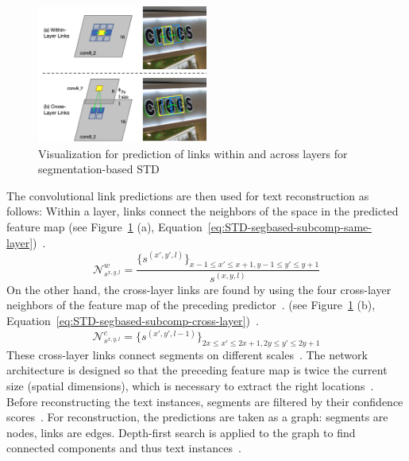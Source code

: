 \begin{figure}[ht]
    \centering
    \includegraphics[width=0.5\textwidth]{img/STD-seg-based-links-Shi-Detecting-2017.png}
    \caption[Link prediction for segmentation-based STD]{%
        Visualization for prediction of links within and across layers for segmentation-based
        STD~\citep{shi_detecting_2017}\label{fig:STD-segbased-component-links}
    }
\end{figure}
The convolutional link predictions are then used for text reconstruction as follows:
Within a layer, links connect the neighbors of the space in the predicted feature map
(see Figure~\ref{fig:STD-segbased-component-links} (a),
Equation~\ref{eq:STD-segbased-subcomp-same-layer})~\citep{shi_detecting_2017}.
\begin{equation}\label{eq:STD-segbased-subcomp-same-layer}
    \mathcal{N}_{s^{x,y,l}}^w =
        \frac{{\{s^{(x',y',l)}\}}_{x-1\leq x'\leq x+1,y-1\leq y'\leq y+1}}{s^{(x,y,l)}}
\end{equation}
On the other hand, the cross-layer links are found by using the four cross-layer neighbors of the
feature map of the preceding predictor~\citep{shi_detecting_2017}.
(see Figure~\ref{fig:STD-segbased-component-links} (b),
Equation~\ref{eq:STD-segbased-subcomp-cross-layer})~\citep{shi_detecting_2017}.
\begin{equation}\label{eq:STD-segbased-subcomp-cross-layer}
    \mathcal{N}_{s^{x,y,l}}^c = {\{s^{(x',y',l-1)}\}}_{2x\leq x'\leq 2x+1,2y\leq y'\leq 2y+1}
\end{equation}
These cross-layer links connect segments on different scales~\citep{shi_detecting_2017}.
The network architecture is designed so that the preceding feature map is twice the current size
(spatial dimensions), which is necessary to extract the right
locations~\citep{shi_detecting_2017}.
Before reconstructing the text instances, segments are filtered by their confidence
scores~\citep{shi_detecting_2017}.
For reconstruction, the predictions are taken as a graph: segments are nodes, links are edges.
Depth-first search is applied to the graph to find connected components and thus text
instances~\citep{shi_detecting_2017}.

